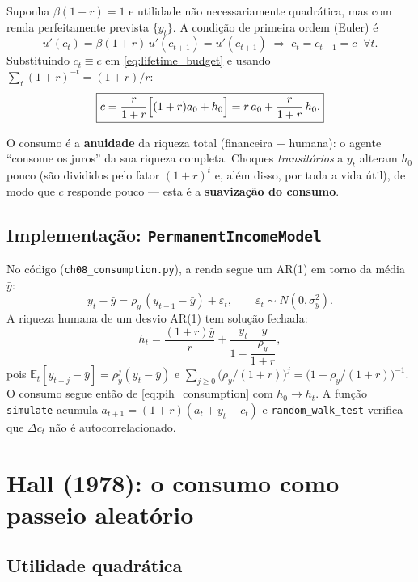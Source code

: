 \documentclass[11pt,a4paper]{article}
\newcommand{\E}{\mathbb{E}}
\begin{document}
Suponha $\beta(1+r) = 1$ e utilidade não necessariamente quadrática, mas
com renda perfeitamente prevista $\{y_t\}$. A condição de primeira ordem
(Euler) é
\[
  u'(c_t) = \beta(1+r)\,u'(c_{t+1}) = u'(c_{t+1})
  \;\Longrightarrow\; c_t = c_{t+1} = c \;\;\forall t.
\]
Substituindo $c_t \equiv c$ em \eqref{eq:lifetime_budget} e usando
$\sum_t (1+r)^{-t} = (1+r)/r$:
\begin{equation}\label{eq:pih_consumption}
  \boxed{c = \frac{r}{1+r}\Bigl[(1+r)a_0 + h_0\Bigr]
         = r\,a_0 + \frac{r}{1+r}\,h_0.}
\end{equation}

O consumo é a \textbf{anuidade} da riqueza total (financeira + humana):
o agente ``consome os juros'' da sua riqueza completa. Choques
\emph{transitórios} a $y_t$ alteram $h_0$ pouco (são divididos pelo
fator $(1+r)^t$ e, além disso, por toda a vida útil), de modo que $c$
responde pouco --- esta é a \textbf{suavização do consumo}.

\subsection{Implementação: \texttt{PermanentIncomeModel}}

No código (\texttt{ch08\_consumption.py}), a renda segue um AR(1) em
torno da média $\bar y$:
\[
  y_t - \bar y = \rho_y\,(y_{t-1} - \bar y) + \varepsilon_t,
  \qquad \varepsilon_t \sim N(0,\sigma_y^2).
\]
A riqueza humana de um desvio AR(1) tem solução fechada:
\[
  h_t = \frac{(1+r)\bar y}{r}
        + \frac{y_t - \bar y}{1 - \dfrac{\rho_y}{1+r}},
\]
pois $\E_t[y_{t+j} - \bar y] = \rho_y^j (y_t - \bar y)$ e
$\sum_{j\ge 0} \bigl(\rho_y/(1+r)\bigr)^j = \bigl(1-\rho_y/(1+r)\bigr)^{-1}$.
O consumo segue então de \eqref{eq:pih_consumption} com $h_0 \to h_t$.
A função \texttt{simulate} acumula $a_{t+1}=(1+r)(a_t+y_t-c_t)$ e
\texttt{random\_walk\_test} verifica que $\Delta c_t$ não é
autocorrelacionado.

\section{Hall (1978): o consumo como passeio aleatório}

\subsection{Utilidade quadrática}
\end{document}
